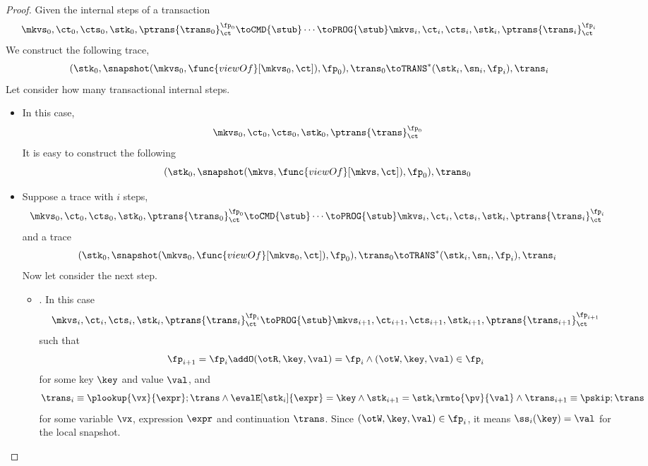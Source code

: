 \begin{proof}
    Given the internal steps of a transaction
    \[
        \mkvs_0, \ct_0, \cts_0, \stk_0, \ptrans{\trans_0}_\ct^{\fp_0} \toCMD{\stub} 
        \cdots  \toPROG{\stub} \mkvs_i, \ct_i, \cts_i, \stk_i, \ptrans{\trans_i}_\ct^{\fp_i}
    \]
    We construct the following trace,
    \[
        (\stk_0, \snapshot(\mkvs_0,\func{viewOf}[\mkvs_0,\ct]), \fp_0), \trans_0 \toTRANS^*
        (\stk_i, \sn_i, \fp_i), \trans_i
    \]
    Let consider how many transactional internal steps.
    \begin{itemize}
        \item {}
        In this case, 
        \[
            \mkvs_0, \ct_0, \cts_0, \stk_0, \ptrans{\trans}_\ct^{\fp_0}
        \]
        It is easy to construct the following
        \[
            (\stk_0, \snapshot(\mkvs,\func{viewOf}[\mkvs,\ct]), \fp_0), \trans_0 
        \]
        \item {}
        Suppose  a trace with \(i\) steps,
        \[
            \mkvs_0, \ct_0, \cts_0, \stk_0, \ptrans{\trans_0}_\ct^{\fp_0} \toCMD{\stub} 
            \cdots  \toPROG{\stub} \mkvs_i, \ct_i, \cts_i, \stk_i, \ptrans{\trans_i}_\ct^{\fp_i}
        \]
        and a trace
        \[
            (\stk_0, \snapshot(\mkvs_0,\func{viewOf}[\mkvs_0,\ct]), \fp_0), \trans_0 \toTRANS^*
            (\stk_i, \sn_i, \fp_i), \trans_i
        \]
        Now let consider the next step.
        \begin{itemize}
            \item {}.
                In this case
                \[
                    \mkvs_i, \ct_i, \cts_i, \stk_i, \ptrans{\trans_i}_\ct^{\fp_i}
                    \toPROG{\stub}
                    \mkvs_{i+1}, \ct_{i+1}, \cts_{i+1}, \stk_{i+1}, \ptrans{\trans_{i+1}}_\ct^{\fp_{i+1}}
                \]
                such that
                \[
                    \fp_{i+1} = \fp_i \addO (\otR, \key, \val)  = \fp_i
                    \land (\otW,\key, \val) \in \fp_i
                \]
                for some key \( \key \) and value \( \val \), and
                \[
                    \trans_{i} \equiv \plookup{\vx}{\expr} ; \trans 
                    \land \evalE[\stk_i]{\expr} = \key 
                    \land \stk_{i+1} = \stk_i\rmto{\pv}{\val}
                    \land  \trans_{i+1} \equiv \pskip ; \trans
                \]
                for some variable \( \vx \), expression \( \expr \) and continuation \( \trans \).
                Since \( ( \otW, \key ,\val ) \in \fp_i  \), it means \( \ss_i(\key) = \val \) for the local snapshot.

\end{itemize}
\end{itemize}
\end{proof}
